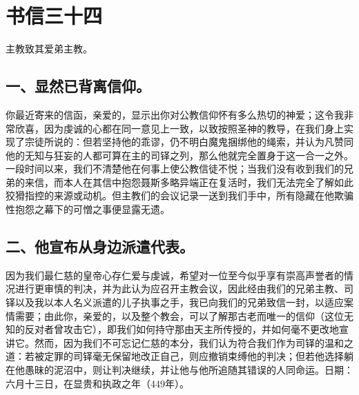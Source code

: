 

\section{书信三十四}

主教致其爱弟主教。\par


\subsection{一、显然已背离信仰。}

你最近寄来的信函，亲爱的，显示出你对公教信仰怀有多么热切的神爱；这令我非常欣喜，因为虔诚的心都在同一意见上一致，以致按照圣神的教导，在我们身上实现了宗徒所说的：但若坚持他的乖谬，仍不明白魔鬼捆绑他的绳索，并认为凡赞同他的无知与狂妄的人都可算在主的司铎之列，那么他就完全置身于这一合一之外。一段时间以来，我们不清楚他在何事上使公教信徒不悦；当我们没有收到我们的兄弟的来信，而本人在其信中抱怨聂斯多略异端正在复活时，我们无法完全了解如此狡猾指控的来源或动机。但主教们的会议记录一送到我们手中，所有隐藏在他欺骗性抱怨之幕下的可憎之事便显露无遗。\par


\subsection{二、他宣布从身边派遣代表。}

因为我们最仁慈的皇帝心存仁爱与虔诚，希望对一位至今似乎享有崇高声誉者的情况进行更审慎的判决，并为此认为应召开主教会议，因此经由我们的兄弟主教、司铎以及我以本人名义派遣的儿子执事之手，我已向我们的兄弟致信一封，以适应案情需要；由此你，亲爱的，以及整个教会，可以了解那古老而唯一的信仰（这位无知的反对者曾攻击它），即我们如何持守那由天主所传授的，并如何毫不更改地宣讲它。然而，因为我们不可忘记仁慈的本分，我们认为符合我们作为司铎的温和之道：若被定罪的司铎毫无保留地改正自己，则应撤销束缚他的判决；但若他选择躺在他愚昧的泥沼中，则让判决继续，并让他与他所追随其错误的人同命运。日期：六月十三日，在显贵和执政之年（449年）。\par

